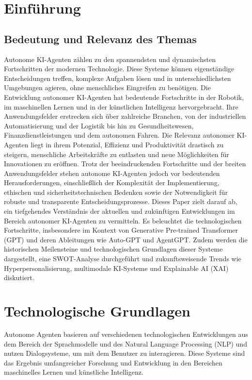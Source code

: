 \documentclass[conference]{IEEEtran}
\begin{document}
\section{Einführung}
\subsection{Bedeutung und Relevanz des Themas}

Autonome KI-Agenten zählen zu den spannendsten und dynamischsten Fortschritten der modernen Technologie. Diese Systeme können eigenständige Entscheidungen treffen, komplexe Aufgaben lösen und in unterschiedlichsten Umgebungen agieren, ohne menschliches Eingreifen zu benötigen. Die Entwicklung autonomer KI-Agenten hat bedeutende Fortschritte in der Robotik, im maschinellen Lernen und in der künstlichen Intelligenz hervorgebracht. Ihre Anwendungsfelder erstrecken sich über zahlreiche Branchen, von der industriellen Automatisierung\cite{evjemo_trends_2020} und der Logistik bis hin zu Gesundheitswesen\cite{liu_application_2021}, Finanzdienstleistungen und dem autonomen Fahren\cite{dikmen_autonomous_2016}. Die Relevanz autonomer KI-Agenten liegt in ihrem Potenzial, Effizienz und Produktivität drastisch zu steigern, menschliche Arbeitskräfte zu entlasten und neue Möglichkeiten für Innovationen zu eröffnen. Trotz der beeindruckenden Fortschritte und der breiten Anwendungsfelder stehen autonome KI-Agenten jedoch vor bedeutenden Herausforderungen, einschließlich der Komplexität der Implementierung, ethischen und sicherheitstechnischen Bedenken sowie der Notwendigkeit für robuste und transparente Entscheidungsprozesse. Dieses Paper zielt darauf ab, ein tiefgehendes Verständnis der aktuellen und zukünftigen Entwicklungen im Bereich autonomer KI-Agenten zu vermitteln. Es beleuchtet die technologischen Fortschritte, insbesondere im Kontext von Generative Pre-trained Transformer (GPT) und deren Ableitungen wie Auto-GPT und AgentGPT. Zudem werden die historischen Meilensteine und technologischen Grundlagen dieser Systeme dargestellt, eine SWOT-Analyse durchgeführt und zukunftsweisende Trends wie Hyperpersonalisierung, multimodale KI-Systeme und Explainable AI (XAI) diskutiert.

\section{Technologische Grundlagen}

Autonome Agenten basieren auf verschiedenen technologischen Entwicklungen aus dem Bereich der Sprachmodelle und des Natural Language Processing (NLP) und nutzen Dialogsysteme, um mit dem Benutzer zu interagieren. Diese Systeme sind das Ergebnis umfangreicher Forschung und Entwicklung in den Bereichen maschinelles Lernen und künstliche Intelligenz.
\end{document}
